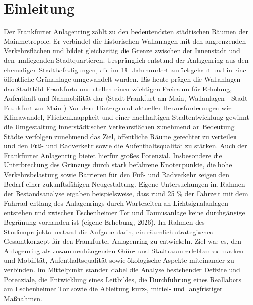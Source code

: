 \documentclass[a4paper,12pt]{article}
\begin{document}


\clearpage

\tableofcontents

\clearpage

\renewcommand{\listfigurename}{Abbildungsverzeichnis}
\listoffigures

\renewcommand{\listtablename}{Tabellenverzeichnis}
\listoftables

\clearpage

\section{Einleitung}

Der Frankfurter Anlagenring zählt zu den bedeutendsten städtischen Räumen der Mainmetropole. Er verbindet die historischen Wallanlagen mit den angrenzenden Verkehrsflächen und bildet gleichzeitig die Grenze zwischen der Innenstadt und den umliegenden Stadtquartieren. Ursprünglich entstand der Anlagenring aus den ehemaligen Stadtbefestigungen, die im 19. Jahrhundert zurückgebaut und in eine öffentliche Grünanlage umgewandelt wurden. Bis heute prägen die Wallanlagen das Stadtbild Frankfurts und stellen einen wichtigen Freiraum für Erholung, Aufenthalt und Nahmobilität dar (Stadt Frankfurt am Main, Wallanlagen | Stadt Frankfurt am Main )
Vor dem Hintergrund aktueller Herausforderungen wie Klimawandel, Flächenknappheit und einer nachhaltigen Stadtentwicklung gewinnt die Umgestaltung innerstädtischer Verkehrsflächen zunehmend an Bedeutung. Städte verfolgen zunehmend das Ziel, öffentliche Räume gerechter zu verteilen und den Fuß- und Radverkehr sowie die Aufenthaltsqualität zu stärken. Auch der Frankfurter Anlagenring bietet hierfür großes Potenzial. Insbesondere die Unterbrechung des Grünzugs durch stark befahrene Knotenpunkte, die hohe Verkehrsbelastung sowie Barrieren für den Fuß- und Radverkehr zeigen den Bedarf einer zukunftsfähigen Neugestaltung. Eigene Untersuchungen im Rahmen der Bestandsanalyse ergaben beispielsweise, dass rund 25 \% der Fahrzeit mit dem Fahrrad entlang des Anlagenrings durch Wartezeiten an Lichtsignalanlagen entstehen und zwischen Eschenheimer Tor und Taunusanlage keine durchgängige Begrünung vorhanden ist (eigene Erhebung, 2026).
Im Rahmen des Studienprojekts bestand die Aufgabe darin, ein räumlich-strategisches Gesamtkonzept für den Frankfurter Anlagenring zu entwickeln. Ziel war es, den Anlagenring als zusammenhängenden Grün- und Stadtraum erlebbar zu machen und Mobilität, Aufenthaltsqualität sowie ökologische Aspekte miteinander zu verbinden. Im Mittelpunkt standen dabei die Analyse bestehender Defizite und Potenziale, die Entwicklung eines Leitbildes, die Durchführung eines Reallabors am Eschenheimer Tor sowie die Ableitung kurz-, mittel- und langfristiger Maßnahmen. 
\end{document}

